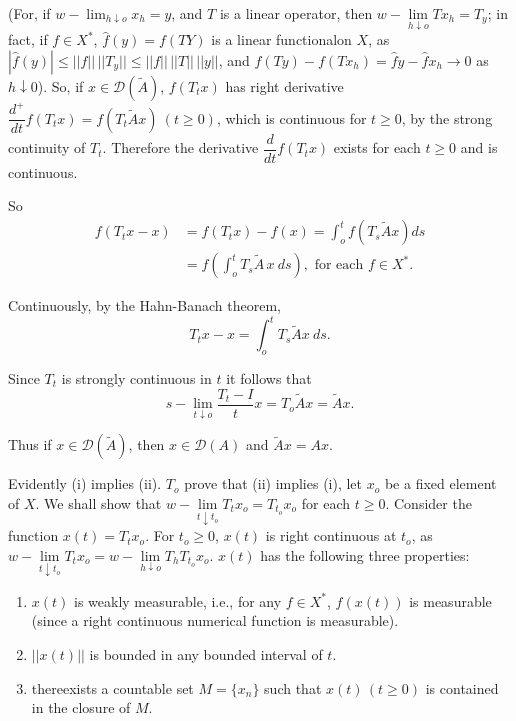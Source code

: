(For, if $w-\lim_{h \downarrow o} x_h =y$, and $T$ is a linear
operator, then $w-\lim\limits_{h \downarrow o} T {x_h}= T_y$; in fact, if $f
\in X^*$, $\hat{f}(y)=f(TY)$ is a linear functional\pageoriginale on $X$, as
$|\hat{f}(y) | \le ||f || \, ||T_y || \le || f ||\, ||T ||\, ||y ||$, and
$f(Ty)-f(Tx_h)= \hat{f}y- \hat{f}x_h \to 0$ as $h \downarrow 0$). So,
if $x \in \mathscr{D} (\tilde{A})$, $f(T_t x)$ has right derivative
$\dfrac{d^+}{dt} f(T_t x) =f (T_t \tilde{A}x)~(t \ge 0)$, which is
continuous for $t \ge 0$, by the strong continuity of $T_t$. Therefore
the derivative $\dfrac{d}{dt} f(T_t x)$ exists for each $t \ge 0$ and
is continuous. 

So 
\begin{align*}
 f(T_t x-x) &= f(T_t x) -f(x)= \int^t_o f(T_s \tilde{A}x ) ds \\
 &= f \left( \int^t_o T_s \tilde{A} \,x ~ds\right), \text{ for each } f
 \in X^*. 
\end{align*}

Continuously, by the Hahn-Banach theorem,
$$
T_t x-x= \int^t_o T_s \tilde{A}x ~ds.
$$

Since $T_t$ is strongly continuous in $t$ it follows that 
$$
s-\lim_{t \downarrow o} \frac{T_t-I}{t} x= T_o \tilde{A} x= \tilde{A} x.
$$

Thus if $x \in \mathscr{D}(\tilde{A})$, then $x \in \mathscr{D}(A)$
and $\tilde{A} x=A x$. 

\begin{Proof} %
 Evidently (i) implies (ii). $T_o$ prove that (ii) implies (i),
 let $x_o$ be a fixed element of $X$. We shall show that
 $w-\lim\limits_{t \downarrow t_o} T_t x_o = T_{t_o} x_o$ for each $t
 \ge 0$. Consider the function $x(t)= T_t x_o$. For $t_o \ge 0$,
 $x(t)$ is right continuous at $t_o$, as $w-\lim\limits_{t \downarrow
  t_o} T_t x_o= w-\lim\limits_{h \downarrow o} T_h T_{t_o}
 x_o$. $x(t)$ has the following three properties: 
 \begin{enumerate}[\rm (a)]
 \item $x(t)$ is weakly measurable, i.e., for any $f \in X^*$,
  $f(x(t))$ is measurable (since a right continuous numerical
  function is measurable). 
 \item $||x(t) ||$ is bounded in any bounded interval of $t$.
 \item there\pageoriginale exists a countable set $M= \{ x_n\}$ such that $x(t)\,(t
  \ge 0)$ is contained in the closure of $M$. 
 \end{enumerate}
\end{Proof}

